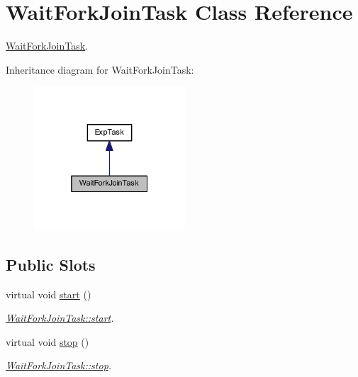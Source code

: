\hypertarget{class_wait_fork_join_task}{}\section{Wait\+Fork\+Join\+Task Class Reference}
\label{class_wait_fork_join_task}


\hyperlink{class_wait_fork_join_task}{Wait\+Fork\+Join\+Task}.  




Inheritance diagram for Wait\+Fork\+Join\+Task\+:\nopagebreak
\begin{figure}[H]
\begin{center}
\leavevmode
\includegraphics[width=160pt]{class_wait_fork_join_task__inherit__graph}
\end{center}
\end{figure}
\subsection*{Public Slots}
\begin{DoxyCompactItemize}
\item 
\hypertarget{class_wait_fork_join_task_a607278e5b945c7a1338035637e3bef3d}{}virtual void \hyperlink{class_wait_fork_join_task_a607278e5b945c7a1338035637e3bef3d}{start} ()\label{class_wait_fork_join_task_a607278e5b945c7a1338035637e3bef3d}

\begin{DoxyCompactList}\small\item\em \hyperlink{class_wait_fork_join_task_a607278e5b945c7a1338035637e3bef3d}{Wait\+Fork\+Join\+Task\+::start}. \end{DoxyCompactList}\item 
\hypertarget{class_wait_fork_join_task_af6ecec14ec65f3a88c11220d8161f5b4}{}virtual void \hyperlink{class_wait_fork_join_task_af6ecec14ec65f3a88c11220d8161f5b4}{stop} ()\label{class_wait_fork_join_task_af6ecec14ec65f3a88c11220d8161f5b4}

\begin{DoxyCompactList}\small\item\em \hyperlink{class_wait_fork_join_task_af6ecec14ec65f3a88c11220d8161f5b4}{Wait\+Fork\+Join\+Task\+::stop}. \end{DoxyCompactList}\end{DoxyCompactItemize}
